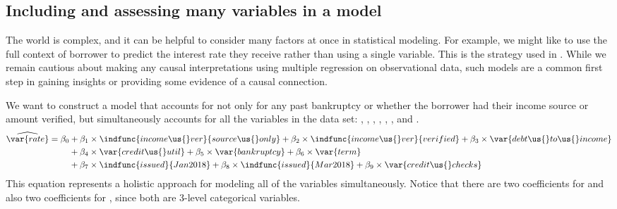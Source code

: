 \subsection{Including and assessing many variables in a model}
\label{includingAndAssessingManyVariablesInAModel}

The world is complex, and it can be helpful to
consider many factors at once in statistical modeling.
For example, we might like to use the full context of
borrower to predict the interest rate they receive
rather than using a single variable.
This is the strategy used in .
While we remain cautious about making any causal
interpretations using multiple regression
on observational data,
such models are a common first step in gaining insights
or providing some evidence of a causal connection.

We want to construct a model that accounts for not only
for any past bankruptcy or whether the borrower had
their income source or amount verified,
but simultaneously accounts for all the variables
in the data set:
,
,
,
,
,
,
and .
\begin{align*}
\widehat{\var{rate}}
	&= \beta_0 +
	    \beta_1\times \indfunc{income\us{}ver}{source\us{}only} +
	    \beta_2\times \indfunc{income\us{}ver}{verified} +
		\beta_3\times \var{debt\us{}to\us{}income} \\
	&\qquad\  +
	    \beta_4 \times \var{credit\us{}util} +
	    \beta_5 \times \var{bankruptcy} +
		\beta_6 \times \var{term} \\
	&\qquad\  +
	    \beta_7 \times \indfunc{issued}{Jan2018} +
	    \beta_8 \times \indfunc{issued}{Mar2018} +
		\beta_9 \times \var{credit\us{}checks}
\end{align*}
This equation represents a holistic approach for modeling
all of the variables simultaneously.
Notice that there are two coefficients for 
and also two coefficients for , since both are
3-level categorical variables.



